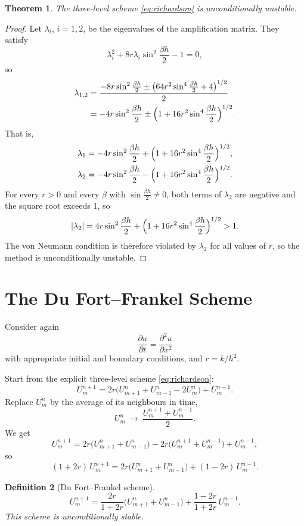 \documentclass[11pt,a4paper]{article}
\numberwithin{equation}{section}
\theoremstyle{spacedplain}
\newtheorem{theorem}{Theorem}[section]
\theoremstyle{spaceddefinition}
\newtheorem{definition}[theorem]{Definition}
\theoremstyle{spacedremark}
\newcommand{\pd}[2]{\frac{\partial #1}{\partial #2}}
\newcommand{\pdd}[2]{\frac{\partial^2 #1}{\partial #2^2}}
\begin{document}
\begin{keybox}
\begin{theorem}\label{thm:richardson}
The three-level scheme \eqref{eq:richardson} is unconditionally
unstable.
\end{theorem}
\end{keybox}

\begin{proof}
Let \(\lambda_i\), \(i=1,2\), be the eigenvalues of the amplification
matrix.  They satisfy
\[
  \lambda_i^2+8r\lambda_i\sin^2\frac{\beta h}2-1=0,
\]
so
\begin{align*}
  \lambda_{1,2}
  &=\frac{-8r\sin^2\frac{\beta h}2
     \pm\bigl(64r^2\sin^4\frac{\beta h}2+4\bigr)^{1/2}}{2}\\
  &=-4r\sin^2\frac{\beta h}2
     \pm\Bigl(1+16r^2\sin^4\frac{\beta h}2\Bigr)^{1/2}.
\end{align*}
That is,
\begin{align*}
  \lambda_1&=-4r\sin^2\frac{\beta h}2
    +\Bigl(1+16r^2\sin^4\frac{\beta h}2\Bigr)^{1/2},\\
  \lambda_2&=-4r\sin^2\frac{\beta h}2
    -\Bigl(1+16r^2\sin^4\frac{\beta h}2\Bigr)^{1/2}.
\end{align*}
For every \(r>0\) and every \(\beta\) with
\(\sin\frac{\beta h}2\ne0\), both terms of \(\lambda_2\) are negative
and the square root exceeds \(1\), so
\[
  |\lambda_2|
  =4r\sin^2\frac{\beta h}2+\Bigl(1+16r^2\sin^4\frac{\beta h}2\Bigr)^{1/2}
  >1 .
\]
The von Neumann condition is therefore violated by \(\lambda_2\) for
all values of \(r\), so the method is unconditionally unstable.
\end{proof}

\section{The Du Fort--Frankel Scheme}

Consider again
\[
  \pd ut=\pdd ux
\]
with appropriate initial and boundary conditions, and \(r=k/h^2\).

Start from the explicit three-level scheme \eqref{eq:richardson}:
\[
  U_m^{n+1}=2r\bigl(U_{m+1}^n+U_{m-1}^n-2U_m^n\bigr)+U_m^{n-1}.
\]
Replace \(U_m^n\) by the average of its neighbours in time,
\[
  U_m^n\ \longrightarrow\ \frac{U_m^{n+1}+U_m^{n-1}}2 .
\]
We get
\[
  U_m^{n+1}=2r\bigl(U_{m+1}^n+U_{m-1}^n\bigr)
  -2r\bigl(U_m^{n+1}+U_m^{n-1}\bigr)+U_m^{n-1},
\]
so
\[
  (1+2r)\,U_m^{n+1}
  =2r\bigl(U_{m+1}^n+U_{m-1}^n\bigr)+(1-2r)\,U_m^{n-1}.
\]

\begin{keybox}
\begin{definition}[Du Fort--Frankel scheme]
\[
  U_m^{n+1}
  =\frac{2r}{1+2r}\bigl(U_{m+1}^n+U_{m-1}^n\bigr)
   +\frac{1-2r}{1+2r}\,U_m^{n-1}.
\]
This scheme is unconditionally stable.
\end{definition}
\end{keybox}
\end{document}
